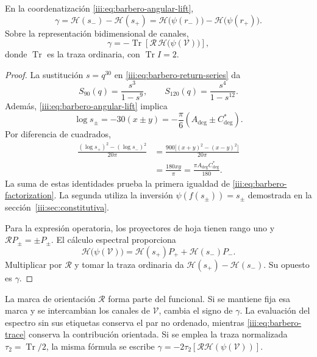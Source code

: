\begin{theorem}
\label{iii:thm:barbero-factorization}
En la coordenatización \eqref{iii:eq:barbero-angular-lift},
\begin{equation}
 \gamma=\mathcal H(s_-)-\mathcal H(s_+)
       =\mathcal H\bigl(\psi(r_-)\bigr)
        -\mathcal H\bigl(\psi(r_+)\bigr).
 \label{iii:eq:barbero-factorization}
\end{equation}
Sobre la representación bidimensional de canales,
\begin{equation}
 \gamma=-\operatorname{Tr}
    \left[\mathcal R\,\mathcal H\bigl(\psi(\mathcal V)\bigr)\right],
 \label{iii:eq:barbero-trace}
\end{equation}
donde $\operatorname{Tr}$ es la traza ordinaria, con
$\operatorname{Tr}I=2$.
\end{theorem}
\begin{proof}
La sustitución $s=q^{30}$ en \eqref{iii:eq:barbero-return-series} da
\[
 S_{90}(q)=\frac{s^3}{1-s^9},\qquad
 S_{120}(q)=\frac{s^4}{1-s^{12}}.
\]
Además, \eqref{iii:eq:barbero-angular-lift} implica
\[
 \log s_\pm=-30(x\pm y)
 =-\frac\pi6(A_{\deg}\pm C^*_{\deg}).
\]
Por diferencia de cuadrados,
\begin{align}
 \frac{(\log s_+)^2-(\log s_-)^2}{20\pi}
 &=\frac{900\bigl[(x+y)^2-(x-y)^2\bigr]}{20\pi}\\
 &=\frac{180xy}{\pi}
 =\frac{\pi A_{\deg}C^*_{\deg}}{180}.
 \label{iii:eq:barbero-log-term}
\end{align}
La suma de estas identidades prueba la primera igualdad de
\eqref{iii:eq:barbero-factorization}. La segunda utiliza la inversión
$\psi(f(s_\pm))=s_\pm$ demostrada en la
sección~\ref{iii:sec:constitutiva}.

Para la expresión operatoria, los proyectores de hoja tienen rango uno y
$\mathcal RP_\pm=\pm P_\pm$. El cálculo espectral proporciona
\[
 \mathcal H\bigl(\psi(\mathcal V)\bigr)
 =\mathcal H(s_+)P_++\mathcal H(s_-)P_-.
\]
Multiplicar por $\mathcal R$ y tomar la traza ordinaria da
$\mathcal H(s_+)-\mathcal H(s_-)$. Su opuesto es $\gamma$.
\end{proof}

La marca de orientación $\mathcal R$ forma parte del funcional. Si se
mantiene fija esa marca y se intercambian los canales de $\mathcal V$,
cambia el signo de $\gamma$. La evaluación del espectro sin sus etiquetas conserva
el par no ordenado, mientras \eqref{iii:eq:barbero-trace} conserva la
contribución orientada. Si se emplea la traza normalizada
$\tau_2=\operatorname{Tr}/2$, la misma fórmula se escribe
$\gamma=-2\tau_2[\mathcal R\mathcal H(\psi(\mathcal V))]$.

